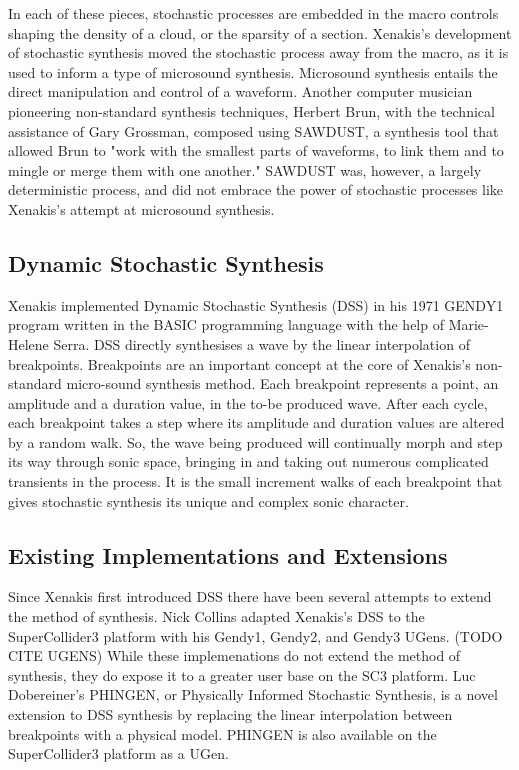 \documentclass[10pt]{article}
\begin{document}
In each of these pieces, stochastic processes are embedded in the macro controls shaping the density of a cloud, or the sparsity of a section. Xenakis's development of stochastic synthesis moved the stochastic process away from the macro, as it is used to inform a type of microsound synthesis. Microsound synthesis entails the direct manipulation and control of a waveform. Another computer musician pioneering non-standard synthesis techniques, Herbert Brun, with the technical assistance of Gary Grossman, composed using SAWDUST, a synthesis tool that allowed Brun to "work with the smallest parts of waveforms, to link them and to mingle or merge them with one another."\citep{sergio2006} SAWDUST was, however, a largely deterministic process, and did not embrace the power of stochastic processes like Xenakis's attempt at microsound synthesis.

\subsection{Dynamic Stochastic Synthesis}
Xenakis implemented Dynamic Stochastic Synthesis (DSS) in his 1971 GENDY1 program written in the BASIC programming language with the help of Marie-Helene Serra.\citep{xenakis1992} DSS directly synthesises a wave by the linear interpolation of breakpoints. Breakpoints are an important concept at the core of Xenakis's non-standard micro-sound synthesis method. Each breakpoint represents a point, an amplitude and a duration value, in the to-be produced wave. After each cycle, each breakpoint takes a step where its amplitude and duration values are altered by a random walk. So, the wave being produced will continually morph and step its way through sonic space, bringing in and taking out numerous complicated transients in the process. It is the small increment walks of each breakpoint that gives stochastic synthesis its unique and complex sonic character.



\subsection{Existing Implementations and Extensions}
Since Xenakis first introduced DSS there have been several attempts to extend the method of synthesis. Nick Collins adapted Xenakis's DSS to the SuperCollider3 platform with his Gendy1, Gendy2, and Gendy3 UGens. (TODO CITE UGENS) While these implemenations do not extend the method of synthesis, they do expose it to a greater user base on the SC3 platform. Luc Dobereiner's PHINGEN, or Physically Informed Stochastic Synthesis, is a novel extension to DSS synthesis by replacing the linear interpolation between breakpoints with a physical model.\citep{luc2011dobereiner} PHINGEN is also available on the SuperCollider3 platform as a UGen.
\end{document}
